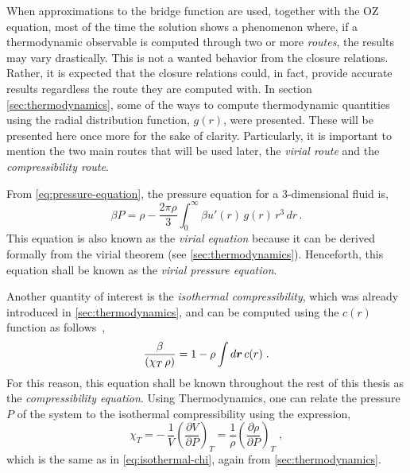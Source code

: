 When approximations to the bridge function are used, together with the OZ equation, most of 
the time the solution shows a phenomenon where, if a thermodynamic observable is computed 
through two or more \emph{routes}, the results may vary drastically. This is not a wanted 
behavior from the closure relations. Rather, it is expected that the closure relations 
could, in fact, provide accurate results regardless the route they are computed with.
In section \autoref{sec:thermodynamics}, some of the ways to compute thermodynamic 
quantities using the radial distribution function, \(g(r)\), were presented. These will be 
presented here once more for the sake of clarity. Particularly, 
it is important to mention the 
two main routes that will be used later, the \emph{virial route} and the 
\emph{compressibility route}.

From \autoref{eq:pressure-equation}, the pressure equation for a $3$-dimensional fluid is,
\begin{equation}
    \beta P = \rho - \frac{2 \pi \rho}{3} \int_{0}^{\infty} \beta u'(r) \, g(r) \, r^3 \, dr \, .
    \label{eq:pressure-gr}
\end{equation}
This equation is also known as the \emph{virial equation} because it can be derived 
formally from the virial theorem (see \autoref{sec:thermodynamics}). Henceforth, 
this equation shall be known as the \emph{virial pressure equation}.

Another quantity of interest is the \emph{isothermal compressibility}, which was already 
introduced in \autoref{sec:thermodynamics}, and can be computed using the \(c(r)\) function 
as follows~\cite{hansenTheorySimpleLiquids2013},
\begin{equation}
    \frac{\beta}{\left( \chi_{T} \,  \rho \right)} = 1 - \rho \int d \bm{r} \, c(r)
    \; .
    \label{eq:compress-gr}
\end{equation}
For this reason, this equation shall be known throughout the rest of this thesis as the 
\emph{compressibility equation}. Using Thermodynamics, one can relate the pressure \(P\) of the system to the isothermal compressibility using the expression,
\begin{equation}
    \chi_{T} = - \, \frac{1}{V} { \left( \frac{\partial V}{\partial P} \right) }_{T} =
    \frac{1}{\rho} { \left( \frac{\partial \rho}{\partial P} \right) }_{T}
    \; ,
    \label{eq:chi-thermo}
\end{equation}
which is the same as in \autoref{eq:isothermal-chi}, again from 
\autoref{sec:thermodynamics}.

